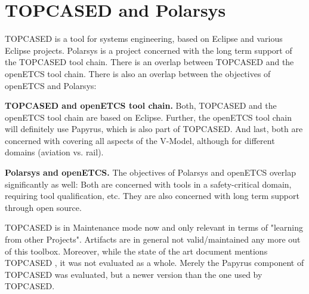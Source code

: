 \section{TOPCASED and Polarsys}

TOPCASED is a tool for systems engineering, based on Eclipse and various Eclipse projects.  Polarsys is a project concerned with the long term support of the TOPCASED tool chain.  There is an overlap between TOPCASED and the openETCS tool chain.  There is also an overlap between the objectives of openETCS and Polarsys:

\textbf{TOPCASED and openETCS tool chain.} Both, TOPCASED and the openETCS tool chain are based on Eclipse.  Further, the openETCS tool chain will definitely use Papyrus, which is also part of TOPCASED.  And last, both are concerned with covering all aspects of the V-Model, although for different domains (aviation vs. rail).

\textbf{Polarsys and openETCS.}  The objectives of Polarsys and openETCS overlap significantly as well: Both are concerned with tools in a safety-critical domain, requiring tool qualification, etc.  They are also concerned with long term support through open source.


TOPCASED is in Maintenance mode now and only relevant in terms of
"learning from other Projects". Artifacts are in general not
valid/maintained any more out of this toolbox. 
Moreover, while the state of the art document mentions TOPCASED \citep{D2_1},
 it was not evaluated as a whole.  Merely the Papyrus component of
 TOPCASED was evaluated, but a newer version than the one used by
 TOPCASED.


